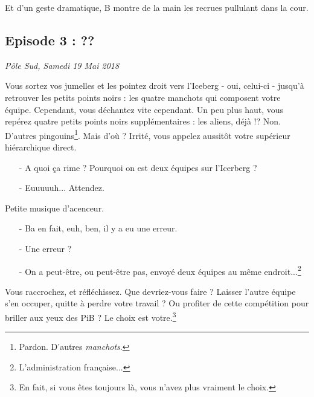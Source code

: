 Et d'un geste dramatique, B montre de la main les recrues pullulant dans la cour.

\subsection{Episode 3 : ??}
\hfill \textit{Pôle Sud, Samedi 19 Mai 2018}

Vous sortez vos jumelles et les pointez droit vers l'Iceberg - oui, celui-ci -
jusqu'à retrouver les petits points noirs : les quatre manchots qui composent
votre équipe.
Cependant, vous déchantez vite cependant. Un peu plus haut, vous repérez
quatre petits points noirs supplémentaires : les aliens, déjà !? Non. D'autres
pingouins\footnote{Pardon. D'autres \emph{manchots}.}. Mais d'où ?
Irrité, vous appelez aussitôt votre supérieur hiérarchique direct.

\begin{itemize}
    \item[-] A quoi ça rime ? Pourquoi on est deux équipes sur l'Icerberg ?
    \item[-] Euuuuuh... Attendez.
\end{itemize}

Petite musique d'acenceur.

\begin{itemize}
    \item[-] Ba en fait, euh, ben, il y a eu une erreur.
    \item[-] Une erreur ?
    \item[-] On a peut-être, ou peut-être pas, envoyé deux équipes au même
        endroit...\footnote{L'administration française...}
\end{itemize}

Vous raccrochez, et réfléchissez. Que devriez-vous faire ? Laisser l'autre
équipe s'en occuper, quitte à perdre votre travail ? Ou profiter de cette
compétition pour briller aux yeux des PiB ? Le choix est votre.\footnote{En
fait, si vous êtes toujours là, vous n'avez plus vraiment le choix.}
